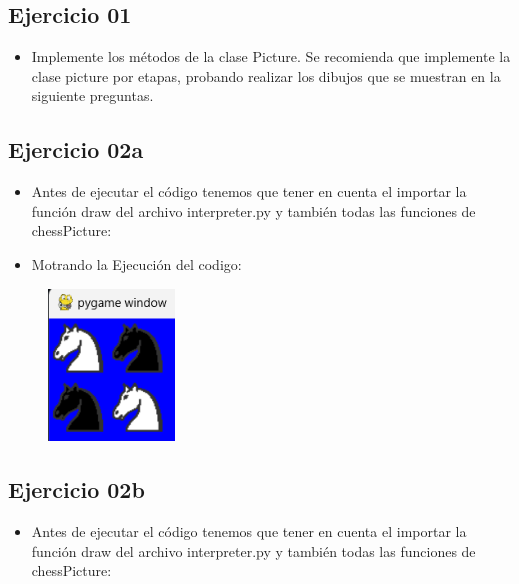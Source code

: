 \documentclass{article}
\begin{document}
	\subsection{Ejercicio 01}
	\begin{itemize}	
		\item Implemente los métodos de la clase Picture. Se recomienda que implemente la clase picture por etapas, probando realizar los dibujos que se muestran en la siguiente preguntas.
	\end{itemize}	
	
		

	\subsection{Ejercicio 02a}
	\begin{itemize}	
		\item Antes de ejecutar el código tenemos que tener en cuenta el importar la función draw del archivo interpreter.py y también todas las funciones de chessPicture:
	\end{itemize}	
	
		

	\begin{itemize}	
		\item Motrando la Ejecución del codigo:
	\end{itemize}	
	
	\begin{figure}[H]
		\centering
		\includegraphics[width=0.3\textwidth,keepaspectratio]{img/Ejercicio2a.png}
	\end{figure}


	\subsection{Ejercicio 02b}
	\begin{itemize}	
		\item Antes de ejecutar el código tenemos que tener en cuenta el importar la función draw del archivo interpreter.py y también todas las funciones de chessPicture:
	\end{itemize}	
	
\end{document}
